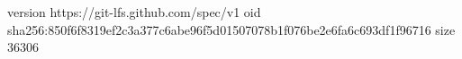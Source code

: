 version https://git-lfs.github.com/spec/v1
oid sha256:850f6f8319ef2c3a377c6abe96f5d01507078b1f076be2e6fa6c693df1f96716
size 36306
